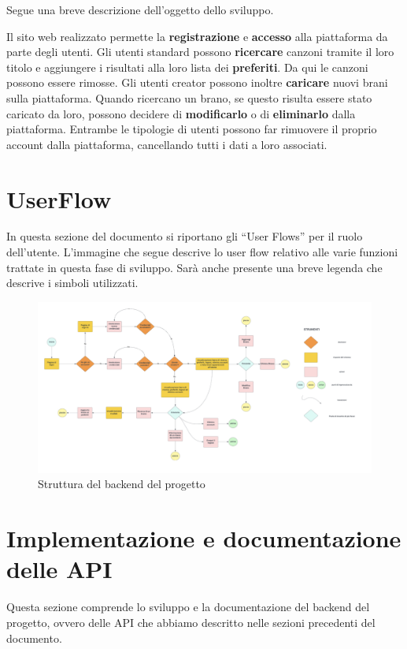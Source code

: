 \documentclass[a4paper,12pt]{article}
\begin{document}
Segue una breve descrizione dell'oggetto dello sviluppo.

Il sito web realizzato permette la \textbf{registrazione} e \textbf{accesso} alla piattaforma da parte degli utenti. Gli utenti standard possono \textbf{ricercare} canzoni tramite il loro titolo e aggiungere i risultati alla loro lista dei \textbf{preferiti}. Da qui le canzoni possono essere rimosse. Gli utenti creator possono inoltre \textbf{caricare} nuovi brani sulla piattaforma. Quando ricercano un brano, se questo risulta essere stato caricato da loro, possono decidere di \textbf{modificarlo} o di \textbf{eliminarlo} dalla piattaforma. Entrambe le tipologie di utenti possono far rimuovere il proprio account dalla piattaforma, cancellando tutti i dati a loro associati.

\newpage
\section{UserFlow}

In questa sezione del documento si riportano gli “User Flows” per il ruolo dell’utente. L’immagine che segue descrive lo user flow relativo alle varie funzioni trattate in questa fase di sviluppo. Sarà anche presente una breve legenda che descrive i simboli utilizzati.

\begin{figure}[htp]
    \centering
    \includegraphics[width=\textwidth]{diagrams/userflow.png}
    \caption{Struttura del backend del progetto}
\end{figure}

\newpage
\section{Implementazione e documentazione delle API}

Questa sezione comprende lo sviluppo e la documentazione del backend del progetto, ovvero delle API che abbiamo descritto nelle sezioni precedenti del documento.
\end{document}
